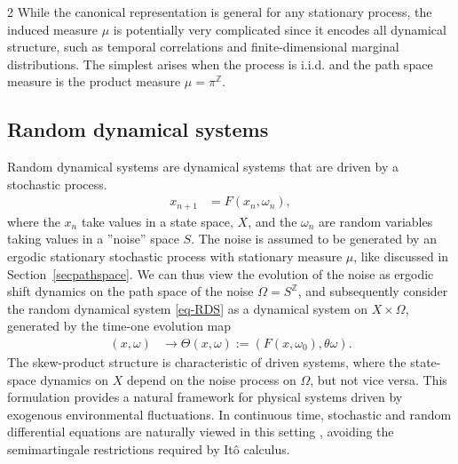 \documentclass[11pt]{article}
\begin{document}
\begin{multicols}{2}
While the canonical representation is general for any stationary process, the induced measure $\mu$ is potentially very complicated since it encodes all dynamical structure, such as temporal correlations and finite-dimensional marginal distributions.
The simplest arises when the process is i.i.d. and the path space measure is the product measure $\mu = \pi^{\mathbb{Z}}$.


\subsection{%
Random dynamical systems}

Random dynamical systems are dynamical systems that are driven by a stochastic process.
\begin{align}
\label{eq-RDS}
x_{n+1} &= F(x_n, \omega_{n}),
\end{align}
where the $x_n$ take values in a state space, $X$, and the $\omega_n$ are random variables taking values in a ''noise'' space $S$. The noise is assumed to be generated by an ergodic stationary stochastic process with stationary measure $\mu$, like discussed in Section~\ref{secpathspace}. We can thus view the evolution of the noise as ergodic shift dynamics on the path space of the noise $\Omega=S^\mathbb{Z}$, and subsequently consider the random dynamical system \eqref{eq-RDS} as a dynamical system 
on $X\times\Omega$, generated by the time-one evolution map
\begin{align}
(x,\omega)&\to \Theta(x,\omega):= (F(x,\omega_0),\theta\omega).
\end{align}
The skew-product structure is characteristic of driven systems, where the state-space dynamics on $X$ depend on the noise process on $\Omega$, but not vice versa. This formulation provides a natural framework for physical systems driven by exogenous environmental fluctuations. In continuous time, stochastic and random differential equations are naturally viewed in this setting \cite{Arnold1998}, avoiding the semimartingale restrictions required by Itô calculus.


\end{multicols}
\end{document}

